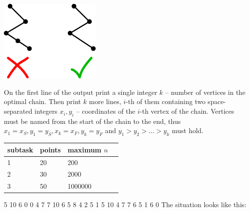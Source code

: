 \begin{center}
\includegraphics[width=5cm]{img/skiing1}
\end{center}

On the first line of the output print a single integer $k$ -- number of vertices in the optimal chain. Then print $k$ more lines, $i$-th of them containing two space-separated integers $x_i, y_i$ -- coordinates of the $i$-th vertex of the chain. Vertices must be named from the start of the chain to the
end, thus
$x_1 = x_S, y_1 = y_S, x_k = x_F, y_k = y_F$ and $y_1 > y_2 > \dots > y_k$ must hold.


\begin{center}
\begin{tabular}{|l|l|l|l|}
\hline
subtask & points & maximum $n$                 \\ \hline
1       & 20     & 200                                          \\ \hline
2       & 30     & 2000                                         \\ \hline
3       & 50     & 1000000                                        \\ \hline
\end{tabular}
\end{center}



5 10 6 0
0 4 7
7 10 6
5 8 4
2 5 1
5 10
4 7
7 6
5 1
6 0
\sampleCOMMENT
The situation looks like this:
\sampleEND
{}


